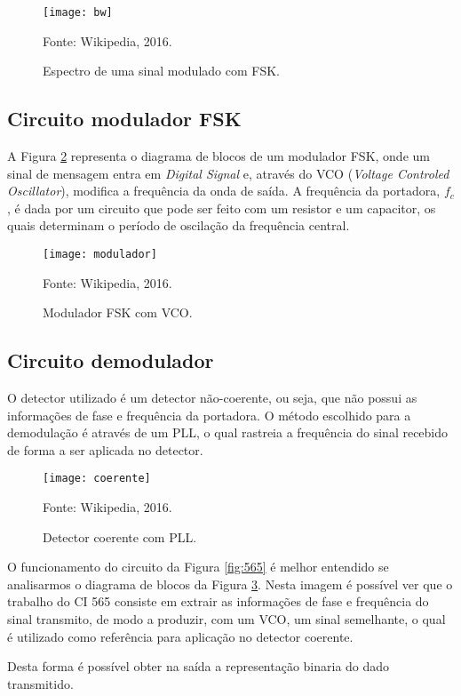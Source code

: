 \begin{figure}[H]
    \centering
    \caption{Espectro de uma sinal modulado com FSK.}
    \texttt{[image: bw]}
    \label{fig:bw}
    
    \small Fonte: Wikipedia, 2016.
\end{figure}

\subsection{Circuito modulador FSK}

A Figura \ref{fig:modulador} representa o diagrama de blocos de um modulador FSK, onde um sinal de mensagem entra em \textit{Digital Signal} e, através do VCO (\textit{Voltage Controled Oscillator}), modifica a frequência da onda de saída. A frequência da portadora, $f_c$, é dada por um circuito que pode ser feito com um resistor e um capacitor, os quais determinam o período de oscilação da frequência central.

\begin{figure}[H]
    \centering
    \caption{Modulador FSK com VCO.}
    \texttt{[image: modulador]}
    \label{fig:modulador}
    
    \small Fonte: Wikipedia, 2016.
\end{figure}

\subsection{Circuito demodulador}

O detector utilizado é um detector não-coerente, ou seja, que não possui as informações de fase e frequência da portadora. O método escolhido para a demodulação é através de um PLL, o qual rastreia a frequência do sinal recebido de forma a ser aplicada no detector.



\begin{figure}[H]
    \centering
    \caption{Detector coerente com PLL.}
    \texttt{[image: coerente]}
    \label{fig:detector}
    
    \small Fonte: Wikipedia, 2016.
\end{figure}

O funcionamento do circuito da Figura \ref{fig:565} é melhor entendido se analisarmos o diagrama de blocos da Figura \ref{fig:detector}. Nesta imagem é possível ver que o trabalho do CI 565 consiste em extrair as informações de fase e frequência do sinal transmito, de modo a produzir, com um VCO, um sinal semelhante, o qual é utilizado como referência para aplicação no detector coerente.

Desta forma é possível obter na saída a representação binaria do dado transmitido.

\newpage